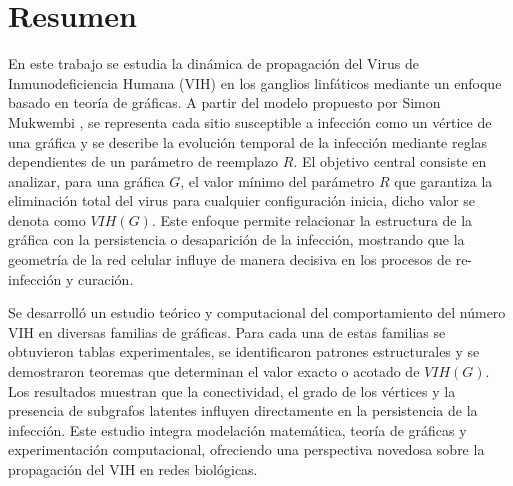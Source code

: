 \documentclass[12pt,titlepage,twoside,openright]{book}
\begin{document}
\frontmatter{}



\pagestyle{plain}
	

\tableofcontents
\newpage 
\listoffigures	




\mainmatter{}
\pagestyle{fancy}
\renewcommand{\chaptermark}[1]{%
\markboth{\chaptername
\ \thechapter.\ #1}{}}
\fancyhead[RO,LE]{\bfseries \thepage}
\fancyfoot{}
\setlength{\parindent}{0pt}
\setlength{\parskip}{1.5ex}



\chapter{Resumen}


En este trabajo se estudia la din\'amica de propagaci\'on del Virus de Inmunodeficiencia Humana (VIH) en los ganglios linf\'aticos mediante un enfoque basado en teor\'ia de gr\'aficas. A partir del modelo propuesto por Simon Mukwembi \cite{Mukwembi}, se representa cada sitio susceptible a infecci\'on como un v\'ertice de una gr\'afica y se describe la evoluci\'on temporal de la infecci\'on mediante reglas dependientes de un par\'ametro de reemplazo $R$. El objetivo central consiste en analizar, para una gr\'afica $G$, el valor m\'inimo del par\'ametro $R$ que garantiza la eliminaci\'on total del virus para cualquier configuraci\'on inicia, dicho valor se denota como $VIH(G)$. Este enfoque permite relacionar la estructura de la gr\'afica con la persistencia o desaparici\'on de la infecci\'on, mostrando que la geometr\'ia de la red celular influye de manera decisiva en los procesos de re-infecci\'on y curaci\'on.

Se desarroll\'o un estudio te\'orico y computacional del comportamiento del n\'umero VIH en diversas familias de gr\'aficas. Para cada una de estas familias se obtuvieron tablas experimentales, se identificaron patrones estructurales y se demostraron teoremas que determinan el valor exacto o acotado de $VIH(G)$. Los resultados muestran que la conectividad, el grado de los v\'ertices y la presencia de subgrafos latentes influyen directamente en la persistencia de la infecci\'on. Este estudio integra modelaci\'on matem\'atica, teor\'ia de gr\'aficas y experimentaci\'on computacional, ofreciendo una perspectiva novedosa sobre la propagaci\'on del VIH en redes biol\'ogicas.
\end{document}
